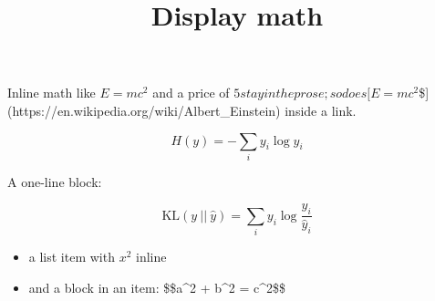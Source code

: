 \documentclass[11pt,a4paper]{article}
\title{Display math}
\begin{document}
\maketitle

Inline math like $E = mc^2$ and a price of $5 stay in the prose; so does
[$$E=mc^2$\$](https://en.wikipedia.org/wiki/Albert\_Einstein) inside a link.

$$H(y) = -\sum_i y_i \log y_i$$

A one-line block:

$$\mbox{KL}(y~||~\hat{y}) = \sum_i y_i \log \frac{y_i}{\hat{y}_i}$$

\begin{itemize}
\item a list item with $x^2$ inline
\item and a block in an item: \$\$a\textasciicircum{}2 + b\textasciicircum{}2 = c\textasciicircum{}2\$\$
\end{itemize}
\end{document}
